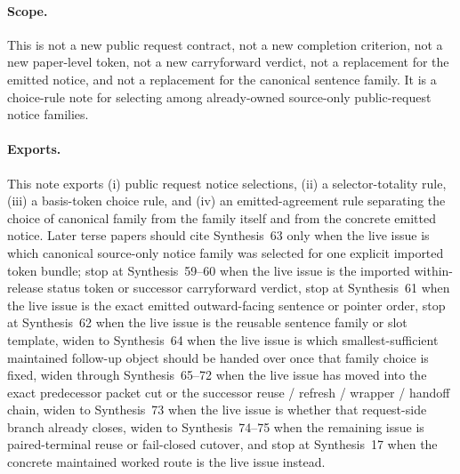 \documentclass[11pt]{article}
\begin{document}
\paragraph{Scope.}
This is not a new public request contract, not a new completion criterion, not a new paper-level token, not a new carryforward verdict, not a replacement for the emitted notice, and not a replacement for the canonical sentence family.
It is a choice-rule note for selecting among already-owned source-only public-request notice families.

\paragraph{Exports.}
This note exports (i) public request notice selections, (ii) a selector-totality rule, (iii) a basis-token choice rule, and (iv) an emitted-agreement rule separating the choice of canonical family from the family itself and from the concrete emitted notice. Later terse papers should cite Synthesis~63 only when the live issue is which canonical source-only notice family was selected for one explicit imported token bundle; stop at Synthesis~59--60 when the live issue is the imported within-release status token or successor carryforward verdict, stop at Synthesis~61 when the live issue is the exact emitted outward-facing sentence or pointer order, stop at Synthesis~62 when the live issue is the reusable sentence family or slot template, widen to Synthesis~64 when the live issue is which smallest-sufficient maintained follow-up object should be handed over once that family choice is fixed, widen through Synthesis~65--72 when the live issue has moved into the exact predecessor packet cut or the successor reuse / refresh / wrapper / handoff chain, widen to Synthesis~73 when the live issue is whether that request-side branch already closes, widen to Synthesis~74--75 when the remaining issue is paired-terminal reuse or fail-closed cutover, and stop at Synthesis~17 when the concrete maintained worked route is the live issue instead.\cite{series:publicrequeststatusenvelopes,series:publicrequestcarryforward,series:publicrequestnotices,series:publicrequestnoticenormalforms,series:publicrequestresponsemenus,series:publicrequestresponsepackets,series:publicrequestresponsepacketcarryforward,series:publicrequestresponsepacketdeltaledgers,series:publicrequestresponsepacketrefreshnotices,series:publicrequestresponsepacketrefreshnormalforms,series:publicrequestresponsepacketrefreshselections,series:publicrequestresponsepacketrefreshresponsemenus,series:publicrequestresponsepacketrefreshresponsepackets,series:publicrequestresponsepacketrefreshresponsepacketclosureverdicts,series:pairedterminalcitationdiscipline,series:pairedterminalcutoverrule,series:workedexample}
\end{document}
